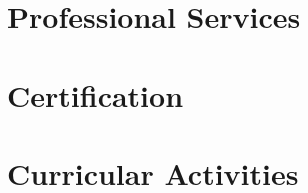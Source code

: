 \documentclass[10pt,a4paper,calibri]{moderncv}
\begin{document}
\section{Professional Services}


\section{Certification}


\section{Curricular Activities}


% 
\end{document}
